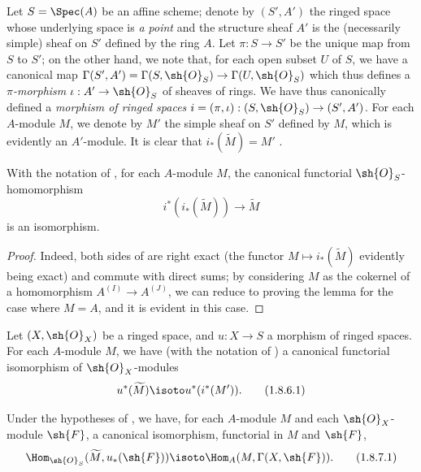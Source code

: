 \begin{env}[1.8.4]
\label{I.1.8.4}
Let $S=\Spec(A)$ be an affine scheme;
denote by $(S',A')$ the ringed space whose underlying space is \emph{a point} and the structure sheaf $A'$ is the (necessarily simple) sheaf on $S'$ defined by the ring $A$.
Let $\pi:S\to S'$ be the unique map from $S$ to $S'$;
on the other hand, we note that, for each open subset $U$ of $S$, we have a canonical map $\Gamma(S',A')=\Gamma(S,\sh{O}_S)\to\Gamma(U,\sh{O}_S)$ which thus defines a \emph{$\pi$-morphism} $\iota:A'\to\sh{O}_S$ of sheaves of rings.
We have thus canonically defined a \emph{morphism of ringed spaces $i=(\pi,\iota):(S,\sh{O}_S)\to(S',A')$}.
For each $A$-module $M$, we denote by $M'$ the simple sheaf on $S'$ defined by $M$, which is evidently an $A'$-module.
It is clear that $i_*(\widetilde{M})=M'$ .
\end{env}

\begin{lemma}[1.8.5]
\label{I.1.8.5}
With the notation of , for each $A$-module $M$, the canonical functorial $\sh{O}_S$-homomorphism 
\[
\label{I.1.8.5.1}
  i^*(i_*(\widetilde{M}))\to\widetilde{M}
  \tag{1.8.5.1}
\]
is an isomorphism.
\end{lemma}

\begin{proof}
Indeed, both sides of  are right exact (the functor $M\mapsto i_*(\widetilde{M})$ evidently being exact) and commute with direct sums;
by considering $M$ as the cokernel of a homomorphism $A^{(I)}\to A^{(J)}$, we can reduce to proving the lemma for the case where $M=A$, and it is evident in this case.
\end{proof}

\begin{corollary}[1.8.6]
\label{I.1.8.6}
Let $(X,\sh{O}_X)$ be a ringed space, and $u:X\to S$ a morphism of ringed spaces.
For each $A$-module $M$, we have (with the notation of ) a canonical functorial isomorphism of $\sh{O}_X$-modules
\[
\label{I.1.8.6.1}
  u^*(\widetilde{M})\isoto u^*(i^*(M')).
  \tag{1.8.6.1}
\]
\end{corollary}

\begin{corollary}[1.8.7]
\label{I.1.8.7}
Under the hypotheses of , we have, for each $A$-module $M$ and each $\sh{O}_X$-module $\sh{F}$, a canonical isomorphism, functorial in $M$ and $\sh{F}$,
\[
\label{I.1.8.7.1}
  \Hom_{\sh{O}_S}(\widetilde{M},u_*(\sh{F}))\isoto\Hom_A(M,\Gamma(X,\sh{F})).
  \tag{1.8.7.1}
\]
\end{corollary}

